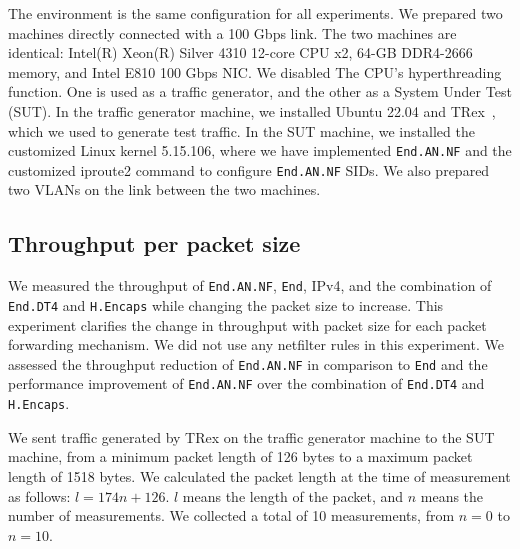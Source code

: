 
The environment is the same configuration for all experiments.
We prepared two machines directly connected with a 100 Gbps link.
The two machines are identical: Intel(R) Xeon(R) Silver 4310 12-core CPU x2, 64-GB DDR4-2666 memory, and Intel E810 100 Gbps NIC.
We disabled The CPU's hyperthreading function.
One is used as a traffic generator, and the other as a System Under Test (SUT).
In the traffic generator machine, we installed Ubuntu 22.04 and TRex~\cite{trex}, which we used to generate test traffic.
In the SUT machine, we installed the customized Linux kernel 5.15.106, where we have implemented \texttt{End.AN.NF} and the customized iproute2 command to configure \texttt{End.AN.NF} SIDs.
We also prepared two VLANs on the link between the two machines.


\subsection{Throughput per packet size}
\label{ssec:eval.thru-size}

We measured the throughput of \texttt{End.AN.NF}, \texttt{End}, IPv4, and the combination of \texttt{End.DT4} and \texttt{H.Encaps} while changing the packet size to increase.
This experiment clarifies the change in throughput with packet size for each packet forwarding mechanism.
We did not use any netfilter rules in this experiment.
We assessed the throughput reduction of \texttt{End.AN.NF} in comparison to \texttt{End} and the performance improvement of \texttt{End.AN.NF} over the combination of \texttt{End.DT4} and \texttt{H.Encaps}.


We sent traffic generated by TRex on the traffic generator machine to the SUT machine, from a minimum packet length of 126 bytes to a maximum packet length of 1518 bytes.
We calculated the packet length at the time of measurement as follows: $l=174n+126$.
$l$ means the length of the packet, and $n$ means the number of measurements.
We collected a total of 10 measurements, from $n=0$ to $n=10$.


